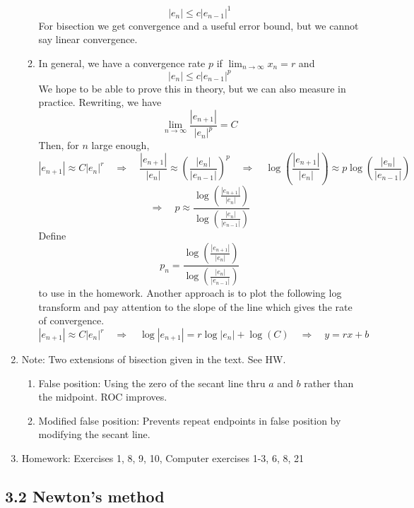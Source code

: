 \documentclass{article}
\newcommand{\ds}{\displaystyle}
\theoremstyle{remark}
\begin{document}
\begin{enumerate}
\begin{enumerate}
\[
|e_n| \leq c |e_{n-1}|^1
\]
For bisection we get convergence and a useful error bound, but we cannot say linear convergence.
\item In general, we have a convergence rate $p$ if $\ds \lim_{n\rightarrow \infty} x_n = r$ and
\[
|e_n| \leq c |e_{n-1}|^p
\]
We hope to be able to prove this in theory, but we can also measure in practice. Rewriting, we have
\[
\lim_{n\rightarrow\infty} \frac{|e_{n+1}|}{|e_n|^p} = C
\]
Then, for $n$ large enough,
\[
|e_{n+1}| \approx C|e_n|^r \quad \Rightarrow \quad
\frac{|e_{n+1}|}{|e_n|} \approx \left(\frac{|e_n|}{|e_{n-1}|}\right)^p \quad \Rightarrow \quad
\log\left(\frac{|e_{n+1}|}{|e_n|}\right) \approx p\log\left(\frac{|e_n|}{|e_{n-1}|}\right)
\]
\[
\Rightarrow \quad p \approx \frac{\log\left(\frac{|e_{n+1}|}{|e_n|}\right)}{\log\left(\frac{|e_n|}{|e_{n-1}|}\right)}
\]
Define
\[
p_n = \frac{\log\left(\frac{|e_{n+1}|}{|e_n|}\right)}{\log\left(\frac{|e_n|}{|e_{n-1}|}\right)}
\]
to use in the homework. Another approach is to plot the following log transform and pay attention to the slope of the line which gives the rate of convergence.
\[
|e_{n+1}| \approx C|e_n|^r \quad \Rightarrow \quad \log|e_{n+1}| = r\log|e_n| + \log(C) \quad \Rightarrow \quad y=rx+b
\] 
\end{enumerate}

\item Note: Two extensions of bisection given in the text. See HW.
\begin{enumerate}
\item False position: Using the zero of the secant line thru $a$ and $b$ rather than the midpoint. ROC improves.
\item Modified false position: Prevents repeat endpoints in false position by modifying the secant line.
\end{enumerate}

\item Homework: Exercises 1, 8, 9, 10, Computer exercises 1-3, 6, 8, 21
\end{enumerate}


\subsection{3.2 Newton's method}
\end{document}
